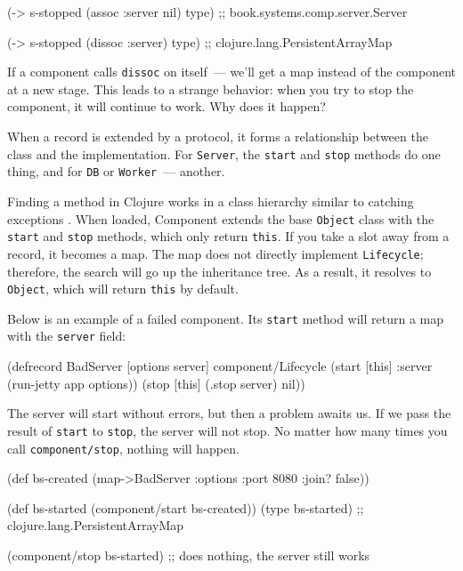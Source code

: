 \begin{english}
  \begin{clojure}
(-> s-stopped
    (assoc :server nil)
    type)
;; book.systems.comp.server.Server

(-> s-stopped
    (dissoc :server)
    type)
;; clojure.lang.PersistentArrayMap
  \end{clojure}
\end{english}

If a component calls \verb|dissoc| on itself~--- we'll get a map instead of the component at a new stage. This leads to a strange behavior: when you try to stop the component, it will continue to work. Why does it happen?

When a record is extended by a protocol, it forms a relationship between the class and the implementation. For \verb|Server|, the \verb|start| and \verb|stop| methods do one thing, and for \verb|DB| or \verb|Worker|~--- another.

Finding a method in Clojure works in a class hierarchy similar to catching exceptions . When loaded, Component extends the base \verb|Object| class with the \verb|start| and \verb|stop| methods, which only return \verb|this|. If you take a slot away from a record, it becomes a map. The map does not directly implement \verb|Lifecycle|; therefore, the search will go up the inheritance tree. As a result, it resolves to \verb|Object|, which will return \verb|this| by default.

Below is an example of a failed component. Its \verb|start| method will return a map with the \verb|server| field:

\begin{english}
  \begin{clojure}
(defrecord BadServer [options server]
  component/Lifecycle
  (start [this]
    {:server (run-jetty app options)})
  (stop [this]
    (.stop server)
    nil))
  \end{clojure}
\end{english}

The server will start without errors, but then a problem awaits us. If we pass the result of \verb|start| to \verb|stop|, the server will not stop. No matter how many times you call \verb|component/stop|, nothing will happen.

\ifnarrow

\begin{english}
  \begin{clojure}
(def bs-created
  (map->BadServer
    {:options {:port 8080
               :join? false}}))

(def bs-started
   (component/start bs-created))
(type bs-started)
;; clojure.lang.PersistentArrayMap

(component/stop bs-started)
;; does nothing, the server still works
  \end{clojure}
\end{english}

